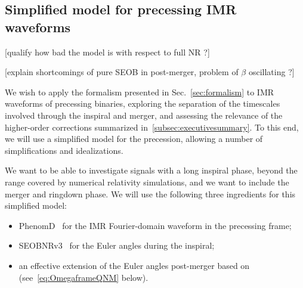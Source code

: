 \documentclass[aps,showpacs,twocolumn,
prd,superscriptaddress,nofootinbib]{revtex4-1}
\newcommand{\SM}[1]{{\color{Red} #1}}
\begin{document}
\subsection{Simplified model for precessing IMR waveforms}
\label{subsec:precmodel}

\SM{[qualify how bad the model is with respect to full NR ?]}

\SM{[explain shortcomings of pure SEOB in post-merger, problem of $\beta$ oscillating ?]}

We wish to apply the formalism presented in Sec.~\ref{sec:formalism} to IMR waveforms of precessing binaries, exploring the separation of the timescales involved through the inspiral and merger, and assessing the relevance of the higher-order corrections summarized in~\ref{subsec:executivesummary}. To this end, we will use a simplified model for the precession, allowing a number of simplifications and idealizations.


We want to be able to investigate signals with a long inspiral phase, beyond the range covered by numerical relativity simulations, and we want to include the merger and ringdown phase. We will use the following three ingredients for this simplified model:
\begin{itemize}
	\item PhenomD~\cite{Husa+15, Khan+15} for the IMR Fourier-domain waveform in the precessing frame;
	\item SEOBNRv3~\cite{Pan+13, BTB16} for the Euler angles during the inspiral;
	\item an effective extension of the Euler angles post-merger based on~\cite{OShaughnessy+12} (see~\eqref{eq:OmegaframeQNM} below).
\end{itemize}
\end{document}
